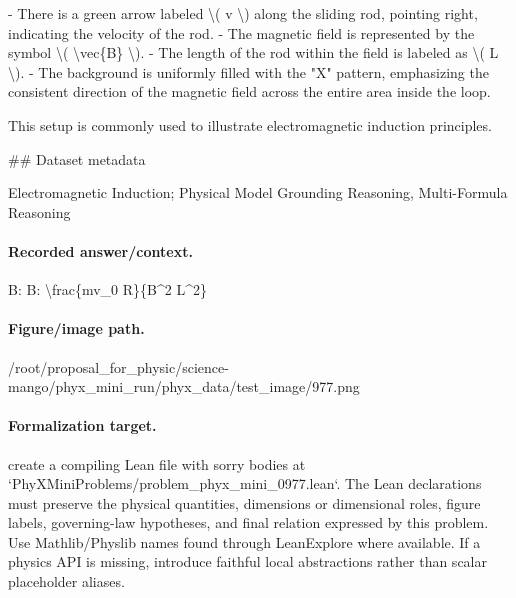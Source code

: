 - There is a green arrow labeled \textbackslash{}( v \textbackslash{}) along the sliding rod, pointing right, indicating the velocity of the rod.
- The magnetic field is represented by the symbol \textbackslash{}( \textbackslash{}vec\{B\} \textbackslash{}).
- The length of the rod within the field is labeled as \textbackslash{}( L \textbackslash{}).
- The background is uniformly filled with the "X" pattern, emphasizing the consistent direction of the magnetic field across the entire area inside the loop.

This setup is commonly used to illustrate electromagnetic induction principles.

\#\# Dataset metadata

Electromagnetic Induction; Physical Model Grounding Reasoning, Multi-Formula Reasoning

\paragraph{Recorded answer/context.}
B: B: \textbackslash{}frac\{mv\_0 R\}\{B\textasciicircum{}2 L\textasciicircum{}2\}

\paragraph{Figure/image path.}
/root/proposal\_for\_physic/science-mango/phyx\_mini\_run/phyx\_data/test\_image/977.png

\paragraph{Formalization target.}
create a compiling Lean file with sorry bodies at `PhyXMiniProblems/problem\_phyx\_mini\_0977.lean`. The Lean declarations must preserve the physical quantities, dimensions or dimensional roles, figure labels, governing-law hypotheses, and final relation expressed by this problem.
Use Mathlib/Physlib names found through LeanExplore where available. If a physics API is missing, introduce faithful local abstractions rather than scalar placeholder aliases.

